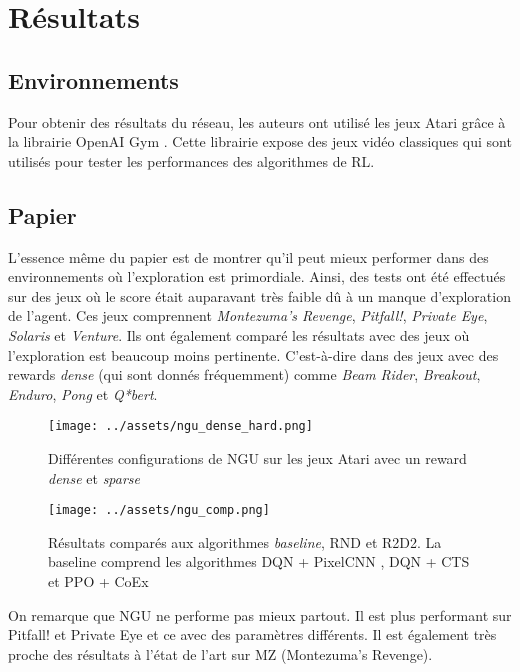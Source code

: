 \section{Résultats}

\subsection{Environnements}

Pour obtenir des résultats du réseau, les auteurs ont utilisé les jeux Atari grâce à la librairie OpenAI Gym \cite{OpenAI_Gym}. Cette librairie expose des jeux vidéo classiques qui sont utilisés pour tester les performances des algorithmes de RL.

\subsection{Papier}

L'essence même du papier  est de montrer qu'il peut mieux performer dans des environnements où l'exploration est primordiale. Ainsi, des tests ont été effectués sur des jeux où le score était auparavant très faible dû à un manque d'exploration de l'agent. Ces jeux comprennent \textit{Montezuma's Revenge}, \textit{Pitfall!}, \textit{Private Eye}, \textit{Solaris} et \textit{Venture}. Ils ont également comparé les résultats avec des jeux où l'exploration est beaucoup moins pertinente. C'est-à-dire dans des jeux avec des rewards \textit{dense} (qui sont donnés fréquemment) comme \textit{Beam Rider}, \textit{Breakout}, \textit{Enduro}, \textit{Pong} et \textit{Q*bert}.

\begin{figure}[H]
    \centering
    \texttt{[image: ../assets/ngu\_dense\_hard.png]}
    \caption{Différentes configurations de NGU sur les jeux Atari avec un reward \textit{dense} et \textit{sparse}}
\end{figure}

\begin{figure}[H]
    \centering
    \texttt{[image: ../assets/ngu\_comp.png]}
    \caption{Résultats comparés aux algorithmes \textit{baseline}, RND et R2D2. La baseline comprend les algorithmes DQN + PixelCNN \cite{DQNPixelCNN}, DQN + CTS et PPO + CoEx \cite{PPO_CoEx}}
\end{figure}

On remarque que NGU ne performe pas mieux partout. Il est plus performant sur Pitfall! et Private Eye et ce avec des paramètres différents. Il est également très proche des résultats à l'état de l'art sur MZ (Montezuma's Revenge).

